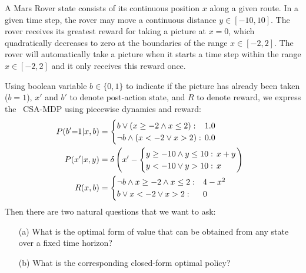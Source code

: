 \begin{example*}[\MarsRover]
\label{ex:marsrover}
A Mars Rover state consists of its continuous position $x$ along a
given route.  In a given time step, the rover may move a 
continuous distance $y \in [-10,10]$.  The rover receives its greatest
reward for taking a picture at $x=0$, which quadratically decreases
to zero at the boundaries of the range $x \in [-2,2]$.  The rover will
automatically take a picture when it starts a time step within the
range $x \in [-2,2]$ and it only receives this reward once.
\end{example*}
Using boolean variable $b \in \{0,1\}$ to indicate if the picture has
already been taken ($b=1$), $x'$ and $b'$ to denote 
post-action state, and $R$ to denote reward, we 
express the \MarsRover\ CSA-MDP using piecewise dynamics and reward:
\begin{align} 
\hspace{-2.8mm} P(b'\sq=\sq1|x,b) & = 
\begin{cases}
b \lor (x \geq -2 \land x \leq 2): & \sqm 1.0\\
\neg b \land (x < -2 \lor x > 2):  & \sqm 0.0
\end{cases} \label{eq:mr_discrete_trans} \\
\hspace{-2.8mm} P(x'|x,y) & = \delta \left( x' - \begin{cases}
y \geq -10 \land y \leq 10 : & \hspace{-2mm} x + y \\
y < -10 \lor y > 10 : & \hspace{-2mm} x
\end{cases}
\right) \label{eq:mr_cont_trans} \\
\hspace{-2.8mm} R(x,b) & = \begin{cases}
\neg b \land x \geq -2 \land x \leq 2 : & 4 - x^2 \\
b \lor x < -2 \lor x > 2 : & 0
\end{cases} \label{eq:mr_reward}
\end{align}
Then there are two natural questions that we want to ask:
\begin{enumerate}
\item[(a)] What is the optimal form of value that can be 
obtained from any state over a fixed time horizon?
\item[(b)] What is the corresponding closed-form optimal policy?
\end{enumerate}

